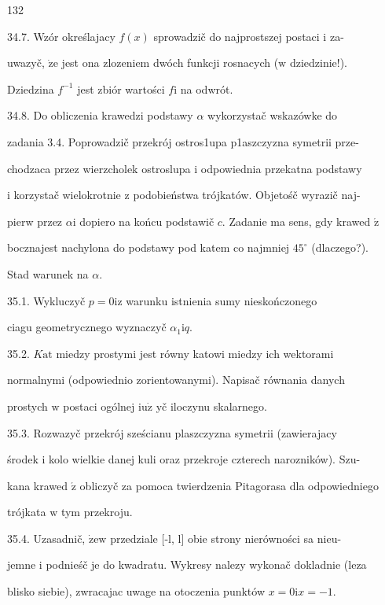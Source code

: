 \documentclass[a4paper,12pt]{article}
\begin{document}
132

34.7. Wzór określajacy $f(x)$ sprowadzič do najprostszej postaci $\mathrm{i}$ za-

uwazyč, $\dot{\mathrm{z}}\mathrm{e}$ jest ona zlozeniem dwóch funkcji rosnacych ($\mathrm{w}$ dziedzinie!).

Dziedzina $f^{-1}$ jest zbiór wartości $f\mathrm{i}$ na odwrót.

34.8. Do obliczenia krawedzi podstawy $\alpha$ wykorzystač wskazówke do

zadania 3.4. Poprowadzič przekrój ostros1upa p1aszczyzna symetrii prze-

chodzaca przez wierzcholek ostroslupa $\mathrm{i}$ odpowiednia przekatna podstawy

$\mathrm{i}$ korzystač wielokrotnie $\mathrm{z}$ podobieństwa trójkatów. Objetośč wyrazič naj-

pierw przez $\alpha \mathrm{i}$ dopiero na końcu podstawič $c$. Zadanie ma sens, gdy krawed $\acute{\mathrm{z}}$

bocznajest nachylona do podstawy pod katem co najmniej $45^{\circ}$ (dlaczego?).

Stad warunek na $\alpha.$

35.1. Wykluczyč $p = 0 \mathrm{i} \mathrm{z}$ warunku istnienia sumy nieskończonego

ciagu geometrycznego wyznaczyč $\alpha_{1}\mathrm{i}q.$

35.2. $K\mathrm{a}\mathrm{t}$ miedzy prostymi jest równy katowi miedzy ich wektorami

normalnymi (odpowiednio zorientowanymi). Napisač równania danych

prostych $\mathrm{w}$ postaci ogólnej $\mathrm{i}\mathrm{u}\dot{\mathrm{z}}$ yč iloczynu skalarnego.

35.3. Rozwazyč przekrój sześcianu plaszczyzna symetrii (zawierajacy

środek $\mathrm{i}$ kolo wielkie danej kuli oraz przekroje czterech narozników). Szu-

kana krawed $\acute{\mathrm{z}}$ obliczyč za pomoca twierdzenia Pitagorasa dla odpowiedniego

trójkata $\mathrm{w}$ tym przekroju.

35.4. Uzasadnič, $\dot{\mathrm{z}}\mathrm{e}\mathrm{w}$ przedziale [-l, l] obie strony nierówności sa nieu-

jemne $\mathrm{i}$ podnieśč je do kwadratu. Wykresy nalezy wykonač dokladnie (leza

blisko siebie), zwracajac uwage na otoczenia punktów $x=0\mathrm{i}x=-1.$
\end{document}
